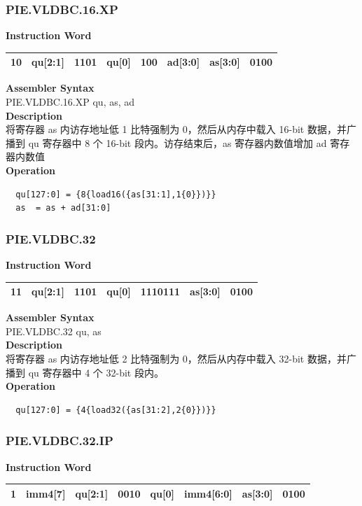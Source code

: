 \newpage
\subsubsection{PIE.VLDBC.16.XP}\label{instruction:PIEVLDBC16XP}
\setlength\tabcolsep{6pt}
\textbf{Instruction Word} \\
\begin{tabular}{|c|c|c|c|c|c|c|c|}
	\hline
	10 & qu[2:1] & 1101 & qu[0] & 100 & ad[3:0] & as[3:0] & 0100 \\
	\hline
\end{tabular}

\textbf{Assembler Syntax} \\
PIE.VLDBC.16.XP qu, as, ad \\
\textbf{Description} \\
将寄存器 as 内访存地址低 1 比特强制为 0，然后从内存中载入 16-bit 数据，并广播到 qu 寄存器中 8 个 16-bit 段内。访存结束后，as 寄存器内数值增加 ad 寄存器内数值\\
\textbf{Operation}
\begin{lstlisting}
  qu[127:0] = {8{load16({as[31:1],1{0}})}}
  as  = as + ad[31:0]
\end{lstlisting}

\newpage
\subsubsection{PIE.VLDBC.32}\label{instruction:PIEVLDBC32}
\setlength\tabcolsep{6pt}
\textbf{Instruction Word} \\
\begin{tabular}{|c|c|c|c|c|c|c|}
	\hline
	11 & qu[2:1] & 1101 & qu[0] & 1110111 & as[3:0] & 0100 \\
	\hline
\end{tabular}

\textbf{Assembler Syntax} \\
PIE.VLDBC.32 qu, as \\
\textbf{Description} \\
将寄存器 as 内访存地址低 2 比特强制为 0，然后从内存中载入 32-bit 数据，并广播到 qu 寄存器中 4 个 32-bit 段内。\\
\textbf{Operation}
\begin{lstlisting}
  qu[127:0] = {4{load32({as[31:2],2{0}})}}
\end{lstlisting}

\newpage
\subsubsection{PIE.VLDBC.32.IP}\label{instruction:PIEVLDBC32IP}
\setlength\tabcolsep{6pt}
\textbf{Instruction Word} \\
\begin{tabular}{|c|c|c|c|c|c|c|c|}
	\hline
	1 & imm4[7] & qu[2:1] & 0010 & qu[0] & imm4[6:0] & as[3:0] & 0100 \\
	\hline
\end{tabular}

